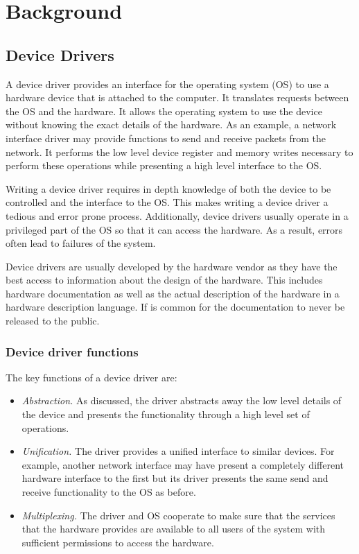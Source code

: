 \chapter{Background}
\label{ch:background}

\section{Device Drivers}

A device driver provides an interface for the operating system (OS) to use a hardware device that is attached to the computer. It translates requests between the OS and the hardware. It allows the operating system to use the device without knowing the exact details of the hardware. As an example, a network interface driver may provide functions to send and receive packets from the network. It performs the low level device register and memory writes necessary to perform these operations while presenting a high level interface to the OS.

Writing a device driver requires in depth knowledge of both the device to be controlled and the interface to the OS. This makes writing a device driver a tedious and error prone process. Additionally, device drivers usually operate in a privileged part of the OS so that it can access the hardware. As a result, errors often lead to failures of the system.

Device drivers are usually developed by the hardware vendor as they have the best access to information about the design of the hardware. This includes hardware documentation as well as the actual description of the hardware in a hardware description language. If is common for the documentation to never be released to the public.

\subsection{Device driver functions}

The key functions of a device driver are:
\begin{itemize}
    \item \emph{Abstraction.} As discussed, the driver abstracts away the low level details of the device and presents the functionality through a high level set of operations.
    \item \emph{Unification.} The driver provides a unified interface to similar devices. For example, another network interface may have present a completely different hardware interface to the first but its driver presents the same send and receive functionality to the OS as before. 
    \item \emph{Multiplexing.} The driver and OS cooperate to make sure that the services that the hardware provides are available to all users of the system with sufficient permissions to access the hardware.
\end{itemize}

